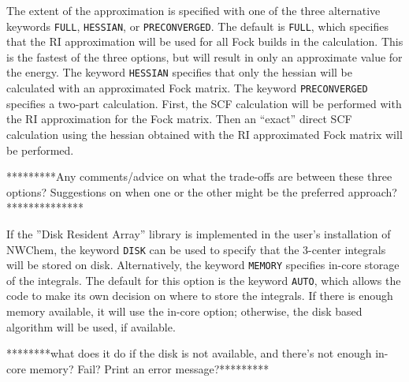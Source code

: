
The extent of the approximation is specified with one of the three
alternative keywords \verb+FULL+, \verb+HESSIAN+, or \verb+PRECONVERGED+.
The default is \verb+FULL+, which specifies that the RI approximation will
be used for all Fock builds in the calculation.  This is the fastest of
the three options, but will result in only an approximate value for the
energy.  The keyword \verb+HESSIAN+ specifies that only the hessian will
be calculated with an approximated Fock matrix.  The keyword 
\verb+PRECONVERGED+ specifies a two-part calculation.  First, the SCF
calculation will be performed with the RI approximation for the Fock
matrix.  Then an ``exact'' direct SCF calculation using the hessian obtained
with the RI approximated Fock matrix will be performed.

\Large
*********Any comments/advice on what the trade-offs are between these
three options?  Suggestions on when one or the other might be the preferred
approach?**************
\normalsize


If the ''Disk Resident Array'' library is implemented in the user's
installation of NWChem, the keyword \verb+DISK+ can be used 
to specify that the 3-center integrals will be stored on disk.  Alternatively,
the keyword \verb+MEMORY+ specifies in-core storage of the integrals.
The default for this option is the keyword \verb+AUTO+, which allows the
code to make its own decision on where to store the integrals.  If there
is enough memory available, it will use the in-core option; otherwise,
the disk based algorithm will be used, if available.

\Large
********what does it do if the disk is not available, and there's not
enough in-core memory?  Fail? Print an error message?*********
\normalsize


